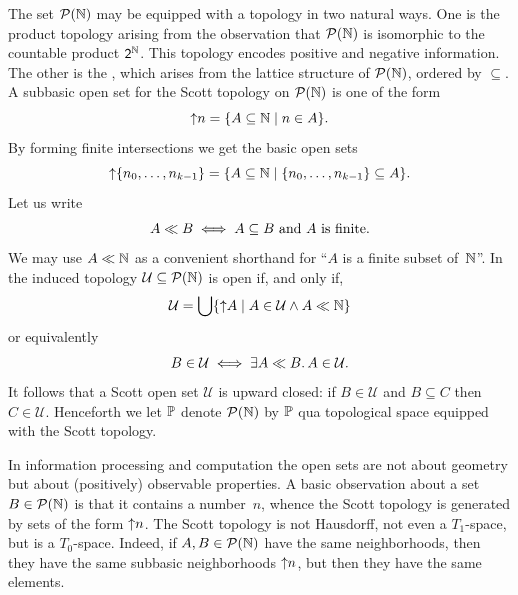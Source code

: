 The set $\mathcal{P}(\mathbb{N})$ may be equipped with a topology in two natural
ways. One is the product topology arising from the observation that
$\mathcal{P}(\mathbb{N})$ is isomorphic to the countable product $\mathsf{2}^{\mathbb{N}}$. This
topology encodes positive and negative information. The other is the
, which arises from the lattice structure of
$\mathcal{P}(\mathbb{N})$, ordered by $\subseteq$. A subbasic open set for the Scott
topology on $\mathcal{P}(\mathbb{N})$ is one of the form
%
\begin{equation*}
  {\uparrow}n = \{A \subseteq \mathbb{N} \mid n \in A\}.
\end{equation*}
%
By forming finite intersections we get the basic open sets
%
\begin{equation*}
  {\uparrow}\{n_0, \ldots, n_{k-1}\} =
  \{A \subseteq \mathbb{N} \mid \{n_0, \ldots, n_{k-1}\} \subseteq A\}.
\end{equation*}
%
Let us write
%
\begin{equation*}
  A \ll B \iff
  \text{$A \subseteq B$ and $A$ is finite.}
\end{equation*}
%
We may use $A \ll \mathbb{N}$ as a convenient shorthand for ``$A$ is a finite subset of~$\mathbb{N}$''.
%
In the induced topology $\mathcal{U} \subseteq \mathcal{P}(\mathbb{N})$ is open if, and only if,
%
\begin{equation*}
  \mathcal{U} =
  \bigcup \{ {\uparrow}A \mid A \in \mathcal{U} \land A \ll \mathbb{N}\}
\end{equation*}
%
or equivalently
%
\begin{equation*}
  B \in \mathcal{U} \iff \exists A \ll B .\, A \in \mathcal{U}.
\end{equation*}
%
It follows that a Scott open set $\mathcal{U}$ is upward closed: if $B \in \mathcal{U}$ and $B \subseteq C$ then $C \in \mathcal{U}$.
Henceforth we let $\mathbb{P}$ denote $\mathcal{P}(\mathbb{N})$ by $\mathbb{P}$ qua topological space equipped with the Scott topology.

In information processing and computation the open sets are not about geometry but about (positively)
observable properties. A basic observation about a set $B \in \mathcal{P}(\mathbb{N})$ is that it contains a number~$n$, whence the Scott topology is generated by sets of the form ${\uparrow}n$.
%
The Scott topology is not Hausdorff, not even a $T_1$-space, but is a $T_0$-space.
%
Indeed, if $A, B \in \mathcal{P}(\mathbb{N})$ have the same neighborhoods, then they have the same subbasic neighborhoods ${\uparrow}n$, but then they have the same elements.

